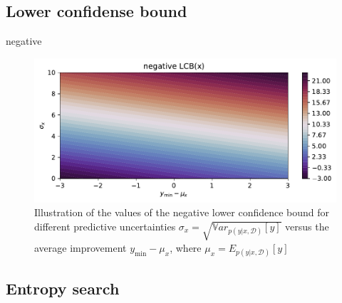 

\subsection{Lower confidense bound}

negative 
\begin{figure}%
    \centering
    \includegraphics[width=\textwidth]{Pictures/neg_lower_confidence_illustration.pdf}
    \caption{Illustration of the values of the negative lower confidence bound for different predictive
    uncertainties $\sigma_x = \sqrt{\mathbb{V}ar_{p(y|x,\mathcal{D})}[y]}$ versus the average
    improvement $y_{\min}-\mu_x$, where $\mu_x = E_{p(y|x,\mathcal{D})}[y]$}
    \label{nLCB_illustration}
\end{figure}

\subsection{Entropy search}



